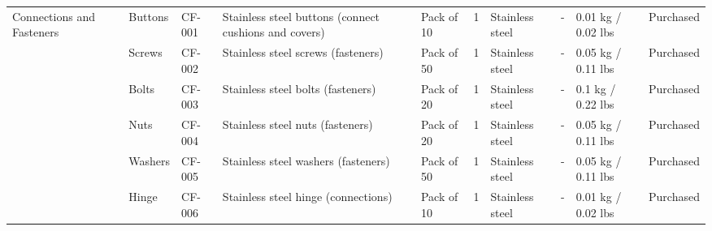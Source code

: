 \begin{sidewaystable}[thp]
{\begin{tabular}{llllllllll}
    \midrule 
    \multirow{6}{*}{Connections and Fasteners} & Buttons          & CF-001 & Stainless steel buttons (connect cushions and covers)     & Pack of 10 & 1        & Stainless steel                       & -                                                & 0.01 kg / 0.02 lbs & Purchased \\
                                               & Screws           & CF-002 & Stainless steel screws (fasteners)                        & Pack of 50 & 1        & Stainless steel                       & -                                                & 0.05 kg / 0.11 lbs & Purchased \\
                                               & Bolts            & CF-003 & Stainless steel bolts (fasteners)                         & Pack of 20 & 1        & Stainless steel                       & -                                                & 0.1 kg / 0.22 lbs  & Purchased \\
                                               & Nuts             & CF-004 & Stainless steel nuts (fasteners)                          & Pack of 20 & 1        & Stainless steel                       & -                                                & 0.05 kg / 0.11 lbs & Purchased \\
                                               & Washers          & CF-005 & Stainless steel washers (fasteners)                       & Pack of 50 & 1        & Stainless steel                       & -                                                & 0.05 kg / 0.11 lbs & Purchased \\
                                               & Hinge            & CF-006 & Stainless steel hinge (connections)                       & Pack of 10 & 1        & Stainless steel                       & -                                                & 0.01 kg / 0.02 lbs & Purchased \\
    \bottomrule                                           
    \end{tabular}
    }
\end{sidewaystable}
    